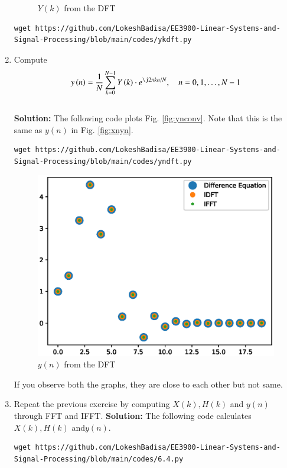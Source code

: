 \documentclass[journal,12pt,twocolumn]{IEEEtran}
\newcommand{\solution}{\noindent \textbf{Solution: }}
\providecommand{\brak}[1]{\ensuremath{\left(#1\right)}}
\numberwithin{equation}{section}
\renewcommand\thesection{\arabic{section}}
\begin{document}
\begin{enumerate}[label=\thesection.\arabic*]
\begin{figure}[!ht]
\caption{$Y(k)$ from the DFT}
\label{fig:yk}
\end{figure}
\begin{lstlisting}
wget https://github.com/LokeshBadisa/EE3900-Linear-Systems-and-Signal-Processing/blob/main/codes/ykdft.py
\end{lstlisting}
\item Compute
\begin{equation}
 y\brak{n}={\frac {1}{N}}\sum _{k=0}^{N-1}Y\brak{k}\cdot e^{\j 2\pi kn/N},\quad n = 0,1,\dots, N-1
\end{equation}
\\
\solution The following code plots Fig. \ref{fig:ynconv}. Note that this is the same as 
$y(n)$ in  Fig. 
\ref{fig:xnyn}. 
%
\begin{lstlisting}
wget https://github.com/LokeshBadisa/EE3900-Linear-Systems-and-Signal-Processing/blob/main/codes/yndft.py
\end{lstlisting}
\begin{figure}[!ht]
\centering
\includegraphics[width=\columnwidth]{./figs/6.4.1}
\caption{$y(n)$ from the DFT}
\label{fig:yndft}
\end{figure}

If you observe both the graphs, they are close to each other but not same.


\item Repeat the previous exercise by computing $X(k), H(k)$ and $y(n)$ through FFT and 
IFFT.
\solution The following code calculates $X(k),H(k)$ and$ y(n)$.
\begin{lstlisting}
wget https://github.com/LokeshBadisa/EE3900-Linear-Systems-and-Signal-Processing/blob/main/codes/6.4.py
\end{lstlisting}
	\end{enumerate}
\end{document}
